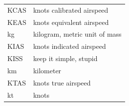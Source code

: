 \documentclass[
]{book}
\begin{document}
\begin{longtable}[]{@{}ll@{}}
\begin{minipage}[t]{0.47\columnwidth}
KCAS\strut
\end{minipage} & \begin{minipage}[t]{0.47\columnwidth}\raggedright
knots calibrated airspeed\strut
\end{minipage}\tabularnewline
\begin{minipage}[t]{0.47\columnwidth}\raggedright
KEAS\strut
\end{minipage} & \begin{minipage}[t]{0.47\columnwidth}\raggedright
knots equivalent airspeed\strut
\end{minipage}\tabularnewline
\begin{minipage}[t]{0.47\columnwidth}\raggedright
kg\strut
\end{minipage} & \begin{minipage}[t]{0.47\columnwidth}\raggedright
kilogram, metric unit of mass\strut
\end{minipage}\tabularnewline
\begin{minipage}[t]{0.47\columnwidth}\raggedright
KIAS\strut
\end{minipage} & \begin{minipage}[t]{0.47\columnwidth}\raggedright
knots indicated airspeed\strut
\end{minipage}\tabularnewline
\begin{minipage}[t]{0.47\columnwidth}\raggedright
KISS\strut
\end{minipage} & \begin{minipage}[t]{0.47\columnwidth}\raggedright
keep it simple, stupid\strut
\end{minipage}\tabularnewline
\begin{minipage}[t]{0.47\columnwidth}\raggedright
km\strut
\end{minipage} & \begin{minipage}[t]{0.47\columnwidth}\raggedright
kilometer\strut
\end{minipage}\tabularnewline
\begin{minipage}[t]{0.47\columnwidth}\raggedright
KTAS\strut
\end{minipage} & \begin{minipage}[t]{0.47\columnwidth}\raggedright
knots true airspeed\strut
\end{minipage}\tabularnewline
\begin{minipage}[t]{0.47\columnwidth}\raggedright
kt\strut
\end{minipage} & \begin{minipage}[t]{0.47\columnwidth}\raggedright
knots\strut
\end{minipage}\tabularnewline

\end{longtable}
\end{document}

